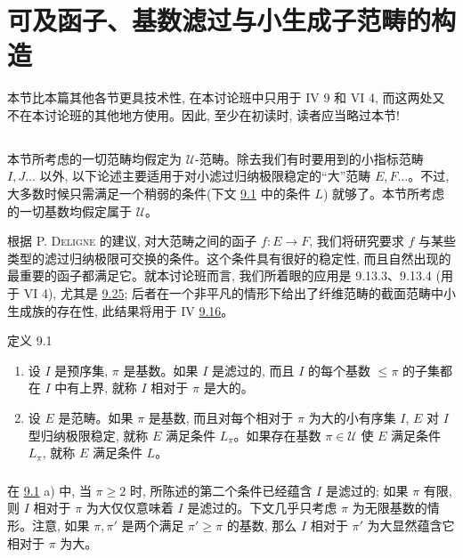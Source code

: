 \section[可及函子与小生成子范畴]{可及函子、基数滤过与小生成子范畴的构造}

本节比本篇其他各节更具技术性, 在本讨论班中只用于 IV 9 和 VI 4, 而这两处又不在本讨论班的其他地方使用。因此, 至少在初读时, 读者应当略过本节!

\setcounter{subsection}{-1}
\subsection{}
本节所考虑的一切范畴均假定为 $𝒰$-范畴。除去我们有时要用到的小指标范畴 $I,J\ldots$ 以外, 以下论述主要适用于对小滤过归纳极限稳定的“大”范畴 $E,F\ldots$。不过, 大多数时候只需满足一个稍弱的条件\pageoriginale (下文 \hyperref[I.def9.1]{9.1} 中的条件 $L$) 就够了。本节所考虑的一切基数均假定属于 $𝒰$。

根据 P. \textsc{Deligne} 的建议, 对大范畴之间的函子 $f:E\rightarrow F$, 我们将研究要求 $f$ 与某些类型的滤过归纳极限可交换的条件。这个条件具有很好的稳定性, 而且自然出现的最重要的函子都满足它。就本讨论班而言, 我们所着眼的应用是 9.13.3、9.13.4 (用于 VI 4), 尤其是 \hyperref[I.cor9.25]{9.25}; 后者在一个非平凡的情形下给出了纤维范畴的截面范畴中小生成族的存在性, 此结果将用于 IV \hyperref[IV.theo9.5.4]{9.16}。

\begin{enonce*}{定义 9.1}
\begin{enumerate}
\renewcommand{\theenumi}{\alph{enumi}}
\renewcommand{\labelenumi}{\theenumi)}
\item 设 $I$ 是预序集, $\pi$ 是基数。如果 $I$ 是滤过的, 而且 $I$ 的每个基数 $\leq \pi$ 的子集都在 $I$ 中有上界, 就称 $I$ 相对于 $\pi$ 是大的。

\item 设 $E$ 是范畴。如果 $\pi$ 是基数, 而且对每个相对于 $\pi$ 为大的小有序集 $I$, $E$ 对 $I$ 型归纳极限稳定, 就称 $E$ 满足条件 $L_{\pi}$。如果存在基数 $\pi\in 𝒰$ 使 $E$ 满足条件 $L_{\pi}$, 就称 $E$ 满足条件 $L$。
\end{enumerate}
\end{enonce*}

\setcounter{subsection}{1}
\subsubsection{}
在 \hyperref[I.def9.1]{9.1} a) 中, 当 $\pi\geq 2$ 时, 所陈述的第二个条件已经蕴含 $I$ 是滤过的; 如果 $\pi$ 有限, 则 $I$ 相对于 $\pi$ 为大仅仅意味着 $I$ 是滤过的。下文几乎只考虑 $\pi$ 为无限基数的情形。注意, 如果 $\pi,\pi'$ 是两个满足 $\pi'\geq\pi$ 的基数, 那么 $I$ 相对于 $\pi'$ 为大显然蕴含它相对于 $\pi$ 为大。

